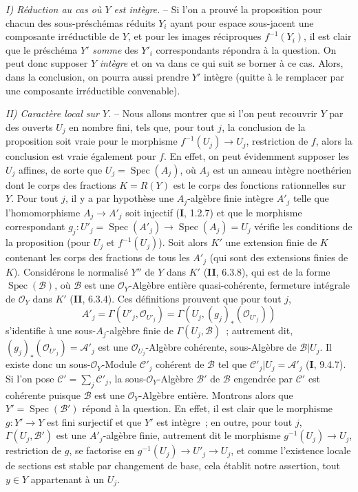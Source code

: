 
\emph{I) Réduction au cas où $Y$ est intègre.} -- Si l'on a prouvé la proposition
pour chacun des sous-préschémas réduits $Y_i$ ayant pour espace sous-jacent une
composante irréductible de $Y$, et pour les images réciproques $f^{-1}(Y_i)$, il est
clair que le préschéma $Y'$ \emph{somme} des $Y'_i$ correspondants répondra à la
question. On peut donc supposer $Y$ \emph{intègre} et on va dans ce qui suit se
borner à ce cas. Alors, dans la conclusion, on pourra aussi prendre $Y'$ intègre
(quitte à le remplacer par une composante irréductible convenable).

\emph{II) Caractère local sur $Y$.} -- Nous allons montrer que si l'on peut
recouvrir $Y$ par des ouverts $U_j$ en nombre fini, tels que, pour tout $j$, la
conclusion de la proposition soit vraie pour le morphisme $f^{-1}(U_j)\to U_j$,
restriction de $f$, alors la conclusion est vraie également pour $f$. En effet, on
peut évidemment supposer les $U_j$ affines, de sorte que $U_j=\operatorname{Spec}(A_j)$, où
$A_j$ est un anneau intègre noethérien dont le corps des fractions $K=R(Y)$ est le
corps des fonctions rationnelles sur $Y$. Pour tout $j$, il y a par hypothèse une
$A_j$-algèbre finie intègre $A'_j$ telle que l'homomorphisme $A_j\to A'_j$ soit
injectif (\textbf{I}, 1.2.7) et que le morphisme correspondant
$g_j:U'_j=\operatorname{Spec}(A'_j)\to\operatorname{Spec}(A_j)=U_j$ vérifie les conditions de la proposition
(pour $U_j$ et $f^{-1}(U_j)$). Soit alors $K'$ une extension finie de $K$ contenant
les corps des fractions de tous les $A'_j$ (qui sont des extensions finies de $K$).
Considérons le normalisé $Y''$ de $Y$ dans $K'$ (\textbf{II}, 6.3.8), qui est de la
forme $\operatorname{Spec}(\mathcal B)$, où $\mathcal B$ est une $\mathcal O_Y$-Algèbre entière
quasi-cohérente, fermeture intégrale de $\mathcal O_Y$ dans $K'$ (\textbf{II},
6.3.4). Ces définitions prouvent que pour tout $j$,
\[
  A'_j=\Gamma(U'_j,\mathcal O_{U'_j})
      =\Gamma(U_j,(g_j)_*(\mathcal O_{U'_j}))
\]
s'identifie à une sous-$A_j$-algèbre finie de $\Gamma(U_j,\mathcal B)$~; autrement
dit, $(g_j)_*(\mathcal O_{U'_j})=\mathcal A'_j$ est une
$\mathcal O_{U_j}$-Algèbre cohérente, sous-Algèbre de $\mathcal B|U_j$. Il existe
donc un sous-$\mathcal O_Y$-Module $\mathcal C'_j$ cohérent de $\mathcal B$ tel que
$\mathcal C'_j|U_j=\mathcal A'_j$ (\textbf{I}, 9.4.7). Si l'on pose
$\mathcal C'=\sum_j\mathcal C'_j$, la sous-$\mathcal O_Y$-Algèbre $\mathcal B'$ de
$\mathcal B$ engendrée par $\mathcal C'$ est cohérente puisque $\mathcal B$ est une
$\mathcal O_Y$-Algèbre entière. Montrons alors que $Y'=\operatorname{Spec}(\mathcal B')$ répond à
la question. En effet, il est clair que le morphisme $g:Y'\to Y$ est fini surjectif
et que $Y'$ est intègre~; en outre, pour tout $j$, $\Gamma(U_j,\mathcal B')$ est une
$A'_j$-algèbre finie, autrement dit le morphisme $g^{-1}(U_j)\to U_j$, restriction
de $g$, se factorise en $g^{-1}(U_j)\to U'_j\to U_j$, et comme l'existence locale
de sections est stable par changement de base, cela établit notre assertion, tout
$y\in Y$ appartenant à un $U_j$.

